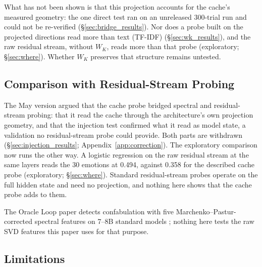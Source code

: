 \documentclass[11pt,a4paper]{article}
\begin{document}
What has not been shown is that this projection accounts for the cache's measured geometry: the one direct test ran on an unreleased 300-trial run and could not be re-verified (\S\ref{sec:bridge_results}). Nor does a probe built on the projected directions read more than text (TF-IDF) (\S\ref{sec:wk_results}), and the raw residual stream, without $W_K$, reads more than that probe (exploratory; \S\ref{sec:where}). Whether $W_K$ preserves that structure remains untested.

\subsection{Comparison with Residual-Stream Probing}

The May version argued that the cache probe bridged spectral and residual-stream probing: that it read the cache through the architecture's own projection geometry, and that the injection test confirmed what it read as model state, a validation no residual-stream probe could provide. Both parts are withdrawn (\S\ref{sec:injection_results}; Appendix~\ref{app:correction}). The exploratory comparison now runs the other way. A logistic regression on the raw residual stream at the same layers reads the 30 emotions at 0.494, against 0.358 for the described cache probe (exploratory; \S\ref{sec:where}). Standard residual-stream probes operate on the full hidden state and need no projection, and nothing here shows that the cache probe adds to them.

The Oracle Loop paper detects confabulation with five Marchenko--Pastur-corrected spectral features on 7--8B standard models \citep{lyra2026oracle}; nothing here tests the raw SVD features this paper uses for that purpose.

\subsection{Limitations}
\label{sec:limitations}
\end{document}
